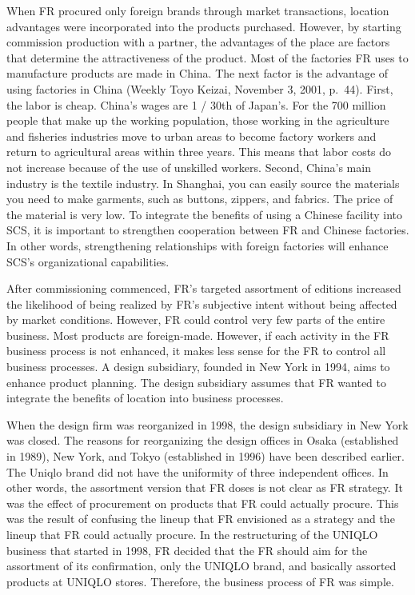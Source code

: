 \documentclass[12pt,a4paper]{article}
\begin{document}
When FR procured only foreign brands through market transactions,
location advantages were incorporated into the products purchased.
However, by starting commission production with a partner, the
advantages of the place are factors that determine the attractiveness of
the product. Most of the factories FR uses to manufacture products are
made in China. The next factor is the advantage of using factories in
China (Weekly Toyo Keizai, November 3, 2001, p.~44). First, the labor is
cheap. China's wages are 1 / 30th of Japan's. For the 700 million people
that make up the working population, those working in the agriculture
and fisheries industries move to urban areas to become factory workers
and return to agricultural areas within three years. This means that
labor costs do not increase because of the use of unskilled workers.
Second, China's main industry is the textile industry. In Shanghai, you
can easily source the materials you need to make garments, such as
buttons, zippers, and fabrics. The price of the material is very low. To
integrate the benefits of using a Chinese facility into SCS, it is
important to strengthen cooperation between FR and Chinese factories. In
other words, strengthening relationships with foreign factories will
enhance SCS's organizational capabilities.

After commissioning commenced, FR's targeted assortment of editions
increased the likelihood of being realized by FR's subjective intent
without being affected by market conditions. However, FR could control
very few parts of the entire business. Most products are foreign-made.
However, if each activity in the FR business process is not enhanced, it
makes less sense for the FR to control all business processes. A design
subsidiary, founded in New York in 1994, aims to enhance product
planning. The design subsidiary assumes that FR wanted to integrate the
benefits of location into business processes.

When the design firm was reorganized in 1998, the design subsidiary in
New York was closed. The reasons for reorganizing the design offices in
Osaka (established in 1989), New York, and Tokyo (established in 1996)
have been described earlier. The Uniqlo brand did not have the
uniformity of three independent offices. In other words, the assortment
version that FR doses is not clear as FR strategy. It was the effect of
procurement on products that FR could actually procure. This was the
result of confusing the lineup that FR envisioned as a strategy and the
lineup that FR could actually procure. In the restructuring of the
UNIQLO business that started in 1998, FR decided that the FR should aim
for the assortment of its confirmation, only the UNIQLO brand, and
basically assorted products at UNIQLO stores. Therefore, the business
process of FR was simple.
\end{document}
